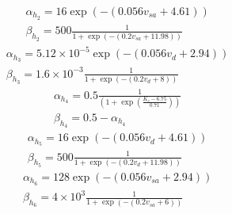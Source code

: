 \documentclass[11pt]{elsarticle}
\newcommand{\e}[1]{\times 10^{#1}}
\begin{document}
	\begin{align}
	&\alpha_{h_2} = 16 \exp(-(0.056 v_{sa} + 4.61)) \\
	&\beta_{h_2} = 500 \frac{1}{1 + \exp(-(0.2 v_{sa} + 11.98))}
	\end{align}
	\begin{align}
	&\alpha_{h_3} = 5.12 \times 10^{-5} \exp(-(0.056 v_{d} + 2.94)) \\
	&\beta_{h_3} = 1.6 \times 10^{-3} \frac{1}{1 + \exp(-(0.2 v_{d} + 8))}
	\end{align}
	\begin{align}
	&\alpha_{h_4} = 0.5 \frac{1}{\left( 1 + \exp \left( \frac{K_e - 6.75}{0.71} \right)  \right)} \\
	&\beta_{h_4} =0.5 - \alpha_{h_4}
	\end{align}
	\begin{align}
	&\alpha_{h_5} = 16 \exp(-(0.056 v_{d} + 4.61)) \\
	&\beta_{h_5} = 500 \frac{1}{1 + \exp(-(0.2 v_{d} + 11.98))} 
	\end{align}
	\begin{align}
	&\alpha_{h_6} = 128 \exp(-(0.056 v_{sa} + 2.94)) \\
	&\beta_{h_6} = 4\e{3} \frac{1}{1 + \exp(-(0.2 v_{sa} + 6))}
	\end{align}
%	
\end{document}

